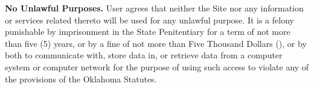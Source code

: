 \textbf{No Unlawful Purposes.}
User agrees that neither the Site nor any information or services related
thereto will be used for any unlawful purpose. It is a felony punishable by
imprisonment in the State Penitentiary for a term of not more than five (5)
years, or by a fine of not more than Five Thousand Dollars (), or by
both to communicate with, store data in, or retrieve data from a computer system
or computer network for the purpose of using such access to violate any of the
provisions of the Oklahoma Statutes.
